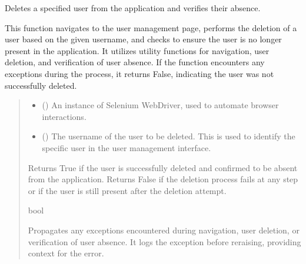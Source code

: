 \documentclass[letterpaper,10pt,english]{sphinxmanual}
\begin{document}
\begin{fulllineitems}
\label{\detokenize{tests:tests.test_delete_user.delete_user}}
\pysigstartsignatures
{}
\pysigstopsignatures
\sphinxAtStartPar
Deletes a specified user from the application and verifies their absence.

\sphinxAtStartPar
This function navigates to the user management page, performs the deletion of a user based on the given username,
and checks to ensure the user is no longer present in the application. It utilizes utility functions for navigation,
user deletion, and verification of user absence. If the function encounters any exceptions during the process, it
returns False, indicating the user was not successfully deleted.
\begin{quote}\begin{description}
\begin{itemize}
\item {} 
\sphinxAtStartPar
{} () \textendash{} An instance of Selenium WebDriver, used to automate browser interactions.

\item {} 
\sphinxAtStartPar
{} () \textendash{} The username of the user to be deleted. This is used to identify the specific user in the 
user management interface.

\end{itemize}

\sphinxAtStartPar
Returns True if the user is successfully deleted and confirmed to be absent from the application.
Returns False if the deletion process fails at any step or if the user is still present after the
deletion attempt.

\sphinxAtStartPar
bool

\sphinxAtStartPar
{} \textendash{} Propagates any exceptions encountered during navigation, user deletion, or verification
of user absence. It logs the exception before re\sphinxhyphen{}raising, providing context for the error.


\end{description}
\end{quote}
\end{fulllineitems}
\end{document}
